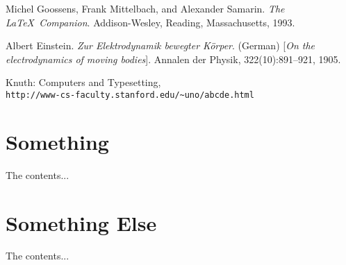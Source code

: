 \documentclass[12pt]{article}
\begin{document}
\newpage
{}
\begin{thebibliography}{9}
Michel Goossens, Frank Mittelbach, and Alexander Samarin.
\textit{The \LaTeX\ Companion}.
Addison-Wesley, Reading, Massachusetts, 1993.

Albert Einstein.
\textit{Zur Elektrodynamik bewegter K{\"o}rper}. (German)
[\textit{On the electrodynamics of moving bodies}].
Annalen der Physik, 322(10):891–921, 1905.

Knuth: Computers and Typesetting,
\\\texttt{http://www-cs-faculty.stanford.edu/\~{}uno/abcde.html}
\end{thebibliography}
\newpage

\begin{appendices}
\section{Something}
The contents...

\newpage
\section{Something Else}
The contents...
\end{appendices}
\end{document}
